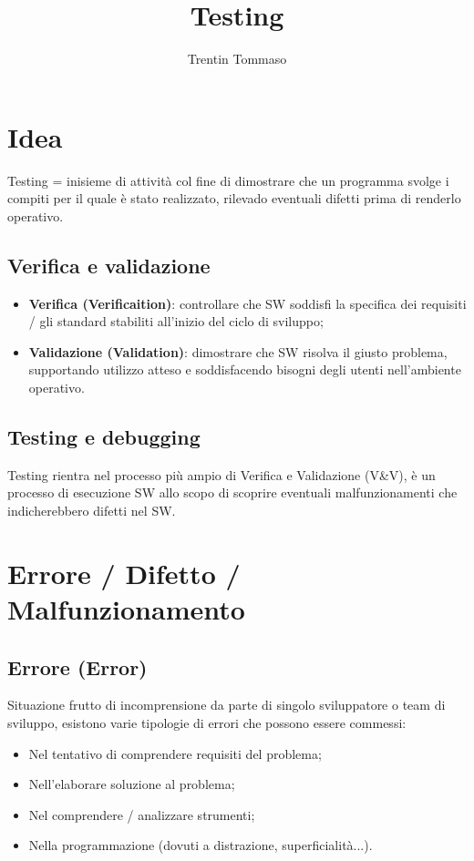 \documentclass{article}
\title{Testing}
\author{Trentin Tommaso}
\begin{document}
\maketitle
\tableofcontents
\newpage

  \section{Idea}
    Testing = inisieme di attività col fine di dimostrare che un programma svolge i compiti per il quale è stato realizzato, rilevado eventuali difetti prima di renderlo operativo.
    \subsection{Verifica e validazione}
      \begin{itemize}
          \item \textbf{Verifica (Verificaition)}: controllare che SW soddisfi la specifica dei requisiti / gli standard stabiliti all'inizio del ciclo di sviluppo;
          \item \textbf{Validazione (Validation)}: dimostrare che SW risolva il giusto problema, supportando utilizzo atteso e soddisfacendo bisogni degli utenti nell'ambiente operativo.
      \end{itemize}
    \subsection{Testing e debugging}
      Testing rientra nel processo più ampio di Verifica e Validazione (V\&V), è un processo di esecuzione SW allo scopo di scoprire eventuali malfunzionamenti che indicherebbero difetti nel SW.
  \section{Errore / Difetto / Malfunzionamento}
    \subsection{Errore (Error)}
      Situazione frutto di incomprensione da parte di singolo sviluppatore o team di sviluppo, esistono varie tipologie di errori che possono essere commessi:
      \begin{itemize}
          \item Nel tentativo di comprendere requisiti del problema;
          \item Nell'elaborare soluzione al problema;
          \item Nel comprendere / analizzare strumenti;
          \item Nella programmazione (dovuti a distrazione, superficialità...).
      \end{itemize}
\end{document}
